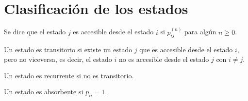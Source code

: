 \section{Clasificación de los estados}

\begin{defi}
Se dice que el estado $j$ es accesible desde el estado $i$ si $p_{ij}^{(n)}$ para algún $n \geq 0$.
\end{defi}

\begin{defi}
Un estado es transitorio si existe un estado $j$ que es accesible desde el estado $i$, pero no viceversa, es decir, el estado $i$ no es accesible desde el estado $j$ con $i \neq j$.
\end{defi}

\begin{defi}
Un estado es recurrente si no es transitorio.
\end{defi}

\begin{defi}
Un estado es absorbente si $p_{ii} = 1$.
\end{defi}
